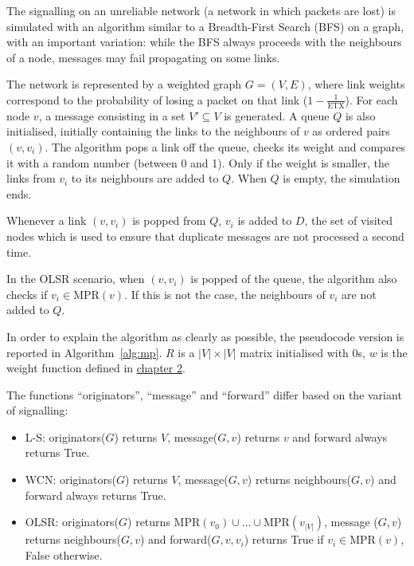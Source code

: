 \documentclass[a4paper,11pt,twoside,openright]{memoir}
\newcommand{\algref}[1] {Algorithm~\ref{#1}}
\newcommand{\etx}{\mathrm{ETX}}
\newcommand{\mpr}{\mathrm{MPR}}
\begin{document}
The signalling on an unreliable network (a network in which
packets are lost) is simulated with an algorithm similar to a Breadth-First
Search (BFS) on a graph, with an important variation: while the BFS
always proceeds with the neighbours of a node, messages may fail
propagating on some links.

The network is represented by a weighted graph $G=(V, E)$, where link
weights correspond to the probability of losing a packet on that link
($1 - \frac{1}{\etx}$). For each node $v$, a message consisting in a set
$V' \subseteq V$ is generated. A queue $Q$ is also initialised,
initially containing the links to the neighbours of $v$ as ordered pairs
$(v, v_i)$.
The algorithm pops a link off the queue, checks its weight and compares it
with a random number (between 0 and 1). Only if the weight is
smaller, the links from $v_i$ to its neighbours are added to $Q$.
When $Q$ is empty, the simulation ends.

Whenever a link $(v, v_i)$ is popped from $Q$, $v_i$ is added to $D$,
the set of visited nodes which is used to ensure that duplicate messages
are not processed a second time.

In the OLSR scenario, when $(v, v_i)$ is popped of the queue, the algorithm
also checks if $v_i \in \mpr(v)$. If this is not the case, the neighbours of
$v_i$ are not added to $Q$.

In order to explain the algorithm as clearly as possible, the pseudocode
version is reported in \algref{alg:mp}. $R$ is a $|V| \times |V|$ matrix
initialised with 0s, $w$ is the weight function defined in
\hyperref[network-topology-and-graphs]{chapter 2}.

The functions ``originators'', ``message'' and ``forward'' differ
based on the variant of signalling:

\begin{itemize}
\itemsep1pt\parskip0pt
\item
  L-S: originators($G$) returns $V$, message($G, v$) returns $v$ and
  forward always returns True.
\item
  WCN: originators($G$) returns $V$, message($G, v$) returns
  neighbours($G, v$) and forward always returns True.
\item
  OLSR: originators($G$) returns $\mpr(v_0) \cup \ldots \cup \mpr(v_{|V|})$,
  message ($G, v$) returns neighbours($G, v$) and forward($G, v, v_i$)
  returns True if $v_i \in \mpr(v)$, False otherwise.
\end{itemize}
\end{document}
